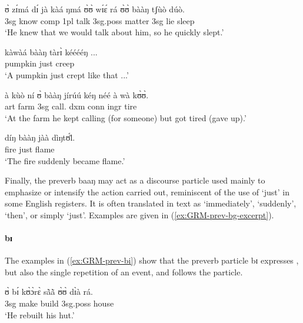 \begin{exe}
\begin{exe}
\begin{exe}
\begin{exe}
\begin{exe}
\begin{exe}
\begin{exe}
\begin{exe}
\begin{exe}
\begin{exe}
\begin{exe}
\begin{exe}
 \ea\label{ex:GRM-prev-bg-excerpt}
\ea\label{ex:FUS-mod}
\gll  ʊ̀ zɪ́má dɪ́ jà kàá ŋmá ʊ̀ʊ̀ wɪ́ɛ́ rá ʊ̀ʊ̀ bààŋ tʃùò dúò.\\
 {\sc 3sg}  know {\sc comp}  {\sc 1pl}  {\fut} talk   {\sc 3sg.poss} matter 
{\foc} {\sc 3sg} {\mod} lie sleep\\
\glt  `He knew that we would talk about him, so he quickly slept.'

\ex
\gll kàwàá bààŋ tàrɪ̀ kééééŋ ...\\
pumpkin just creep {\dxm}\\
\glt `A pumpkin just crept like that ...' 

\ex
\gll à kùò ní ʊ̀ bààŋ jírúú kéŋ néé à wà kʊ̀ʊ̀.\\
{\sc art} farm {\postp}  {\sc 3sg} {\mod} call.{\ipfv} {\sc dxm} {\foc} {\sc 
conn} {\sc ingr} tire\\
\glt `At the farm he kept calling (for someone) but got tired (gave up).'


\ex
\gll díŋ bààŋ jàà dìŋtʊ́l̀.\\
fire  just {\ident} flame\\
\glt `The fire suddenly became flame.'

 \z 
 \z

 Finally, the preverb  {\sls baaŋ} may act as a discourse particle used mainly to emphasize or intensify the action carried out, reminiscent of  the use of 
`just' 
in some English registers.  It is often translated in text as `immediately', 
`suddenly', `then',  or simply `just'. Examples are given in 
(\ref{ex:GRM-prev-bg-excerpt}).


\paragraph{bɪ}
\label{sec:GRM-preverb-iteration}

The examples in (\ref{ex:GRM-prev-bi}) show that  the preverb particle {\sls bɪ}
expresses , but also the single repetition of an event, and follows the  particle. 



\ea\label{ex:GRM-prev-bi}

\ea\label{ex:vp33.2.}
\gll ʊ̀ bɪ́ kʊ̀ɔ̀rɛ̀ sã̀ã̀ ʊ̀ʊ̀ dɪ̀à rá.\\
 {\sc 3sg}  {\itr} make build {\sc 3sg.poss} house {\foc}\\
\glt  `He rebuilt his hut.' 


\end{exe}
\end{exe}
\end{exe}
\end{exe}
\end{exe}
\end{exe}
\end{exe}
\end{exe}
\end{exe}
\end{exe}
\end{exe}
\end{exe}
